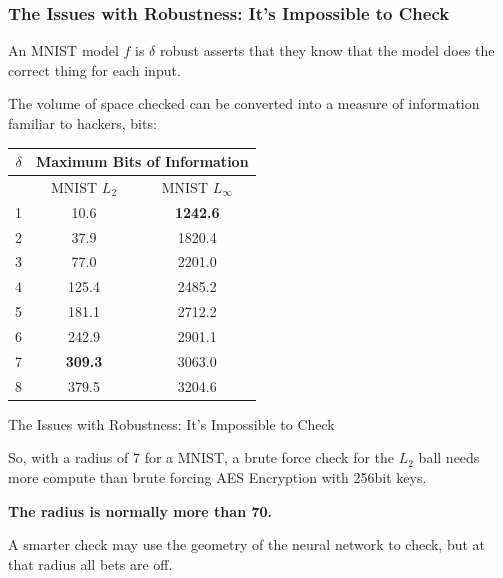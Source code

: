 \documentclass{beamer}
\begin{document}
\begin{frame}
    \frametitle{The Issues with Robustness: It's Impossible to Check}
    An MNIST model $f$ is $\delta$ robust asserts that they know that the model does the correct thing for each input.

    \vspace{10pt}
    The volume of space checked can be converted into a measure of information familiar to hackers, bits:
    
    \begin{center}
        \begin{tabular}{| c || c | c |}
            \hline
            $\delta$ & \multicolumn{2}{|c|}{Maximum Bits of Information} \\
            \hline
            & MNIST $L_2$ & MNIST $L_\infty$ \\
            \hline
        
            1 & 10.6 & \textbf{1242.6} \\
            2 & 37.9 & 1820.4 \\
            3 & 77.0 & 2201.0 \\
            4 & 125.4 & 2485.2 \\
            5 & 181.1 & 2712.2 \\
            6 & 242.9 & 2901.1 \\
            7 & \textbf{309.3} & 3063.0 \\
            8 & 379.5 & 3204.6 \\
        \hline
        \end{tabular}
    \end{center}
\end{frame}

\begin{frame}{The Issues with Robustness: It's Impossible to Check}
    \begin{center}
    So, with a radius of 7 for a MNIST, a brute force check for the $L_2$ ball needs more compute than brute forcing AES Encryption with 256bit keys. 
    
    \vspace{10pt}
    \textbf{The radius is normally more than 70.}

    \vspace{10pt}
    A smarter check may use the geometry of the neural network to check, but at that radius all bets are off.
    \end{center}
\end{frame}
\end{document}
